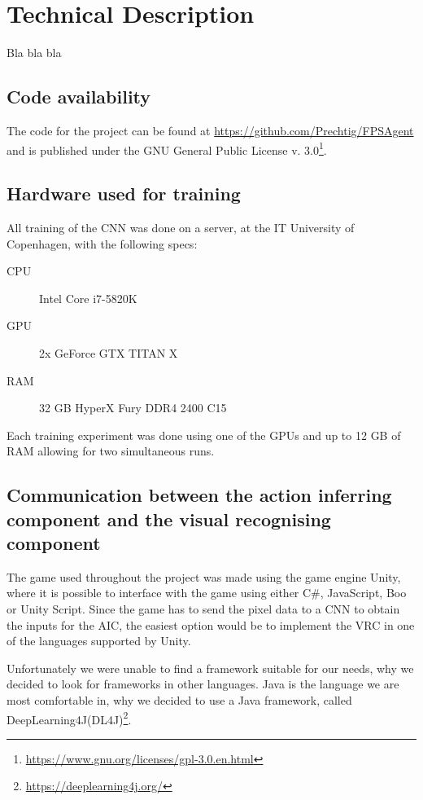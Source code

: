 
\section{Technical Description}
Bla bla bla

\subsection{Code availability}
The code for the project can be found at \url{https://github.com/Prechtig/FPSAgent} and is published under the GNU General Public License v. 3.0\footnote{\url{https://www.gnu.org/licenses/gpl-3.0.en.html}}.

\subsection{Hardware used for training}
\label{sub:hardware}
All training of the CNN was done on a server, at the IT University of Copenhagen, with the following specs:

\begin{description}
	\item [CPU] Intel\textsuperscript{\textregistered} Core\textsuperscript{\texttrademark} i7-5820K
	\item [GPU] 2x GeForce\textsuperscript{\textregistered} GTX TITAN X
	\item [RAM] 32 GB HyperX Fury DDR4 2400 C15
\end{description}	

\noindent
Each training experiment was done using one of the GPUs and up to 12 GB of RAM allowing for two simultaneous runs.

\subsection{Communication between the action inferring component and the visual recognising component}
The game used throughout the project was made using the game engine Unity, where it is possible to interface with the game using either C\#, JavaScript, Boo or Unity Script. Since the game has to send the pixel data to a CNN to obtain the inputs for the AIC, the easiest option would be to implement the VRC in one of the languages supported by Unity.

Unfortunately we were unable to find a framework suitable for our needs, why we decided to look for frameworks in other languages. Java is the language we are most comfortable in, why we decided to use a Java framework, called DeepLearning4J(DL4J)\footnote{\url{https://deeplearning4j.org/}}.

